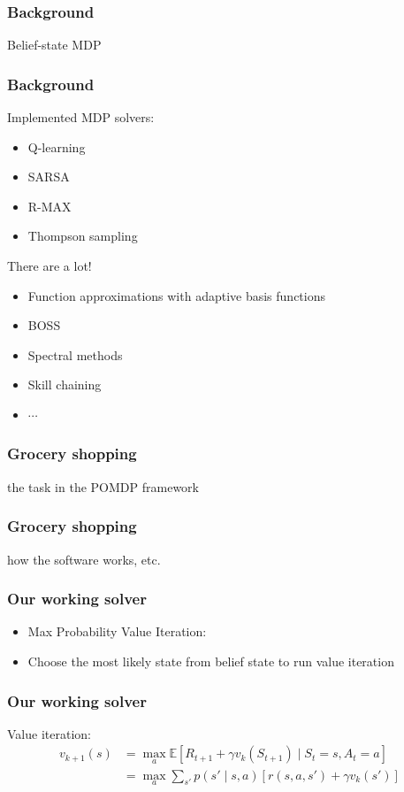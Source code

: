 \documentclass[10pt, compress]{beamer}
\begin{document}
\begin{frame}[fragile]
  \frametitle{Background}
  Belief-state MDP

\end{frame}

\begin{frame}[fragile]
  \frametitle{Background}

  Implemented MDP solvers:
  \begin{itemize}
  \item Q-learning
  \item SARSA
  \item R-MAX
  \item Thompson sampling
  \end{itemize}

  There are a lot!
  \begin{itemize}
  \item Function approximations with adaptive basis functions
  \item BOSS
  \item Spectral methods
  \item Skill chaining
  \item $\cdots$
  \end{itemize}

\end{frame}

\begin{frame}[fragile]
  \frametitle{Grocery shopping}

  the task in the POMDP framework
\end{frame}

\begin{frame}[fragile]
  \frametitle{Grocery shopping}

  how the software works, etc.
\end{frame}


\begin{frame}[fragile]
  \frametitle{Our working solver}
  \begin{itemize}
  \item Max Probability Value Iteration:
  \item Choose the most likely state from belief state to run value iteration
  \end{itemize}
\end{frame}

\begin{frame}[fragile]
  \frametitle{Our working solver}
  Value iteration:
  \begin{align*}
  v_{k+1}(s) &= \max_a \mathbb{E}[R_{t+1} + \gamma v_k(S_{t+1}) \mid S_t = s, A_t = a] \\
  &= \max_a \sum_{s'} p(s' \mid s,a) [r(s,a,s') + \gamma v_k(s')]
  \end{align*}
\end{frame}
\end{document}
